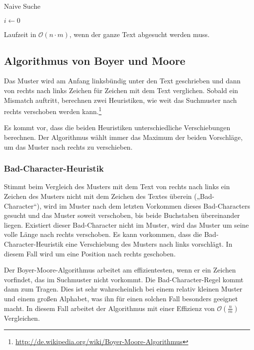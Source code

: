 \begin{algorithm}[H]
	\caption{Naive Suche}

	\BlankLine

	$i \longleftarrow 0$\newline
\end{algorithm}
Laufzeit in \(\mathcal{O}(n\cdot m)\), wenn der ganze Text abgesucht werden muss.

\subsection{Algorithmus von Boyer und Moore}
Das Muster wird am Anfang linksbündig unter den Text geschrieben und dann von rechts nach links Zeichen für Zeichen mit dem Text verglichen. Sobald ein Mismatch auftritt, berechnen zwei Heuristiken, wie weit das Suchmuster nach rechts verschoben werden kann.\footnote{\url{http://de.wikipedia.org/wiki/Boyer-Moore-Algorithmus}}

Es kommt vor, dass die beiden Heuristiken unterschiedliche Verschiebungen berechnen. Der Algorithmus wählt immer das Maximum der beiden Vorschläge, um das Muster nach rechts zu verschieben.

\subsubsection{Bad-Character-Heuristik}
Stimmt beim Vergleich des Musters mit dem Text von rechts nach links ein Zeichen des Musters nicht mit dem Zeichen des Textes überein („Bad-Character“), wird im Muster nach dem letzten Vorkommen dieses Bad-Characters gesucht und das Muster soweit verschoben, bis beide Buchstaben übereinander liegen. Existiert dieser Bad-Character nicht im Muster, wird das Muster um seine volle Länge nach rechts verschoben. Es kann vorkommen, dass die Bad-Character-Heuristik eine Verschiebung des Musters nach links vorschlägt. In diesem Fall wird um eine Position nach rechts geschoben.

Der Boyer-Moore-Algorithmus arbeitet am effizientesten, wenn er ein Zeichen vorfindet, das im Suchmuster nicht vorkommt. Die Bad-Character-Regel kommt dann zum Tragen. Dies ist sehr wahrscheinlich bei einem relativ kleinen Muster und einem großen Alphabet, was ihn für einen solchen Fall besonders geeignet macht. In diesem Fall arbeitet der Algorithmus mit einer Effizienz von \(\mathcal{O}(\frac{n}{m})\) Vergleichen.

